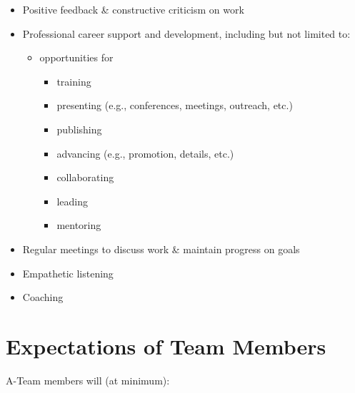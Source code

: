 \documentclass[
  letterpaper,
  DIV=11,
  numbers=noendperiod]{scrreprt}
\providecommand{\tightlist}{%
  \setlength{\itemsep}{0pt}\setlength{\parskip}{0pt}}\usepackage{longtable,booktabs,array}
\begin{document}
\begin{itemize}
\tightlist
\item
  Positive feedback \& constructive criticism on work\\
\item
  Professional career support and development, including but not limited
  to:

  \begin{itemize}
  \tightlist
  \item
    opportunities for

    \begin{itemize}
    \tightlist
    \item
      training\\
    \item
      presenting (e.g., conferences, meetings, outreach, etc.)\\
    \item
      publishing
    \item
      advancing (e.g., promotion, details, etc.)\\
    \item
      collaborating\\
    \item
      leading\\
    \item
      mentoring
    \end{itemize}
  \end{itemize}
\item
  Regular meetings to discuss work \& maintain progress on goals\\
\item
  Empathetic listening\\
\item
  Coaching
\end{itemize}

\section{Expectations of Team
Members}\label{expectations-of-team-members}

A-Team members will (at minimum):
\end{document}
